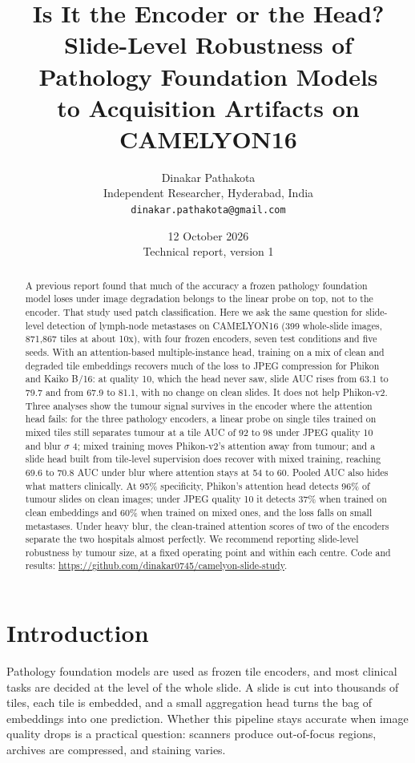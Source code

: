 \documentclass[11pt,a4paper]{article}
\title{\textbf{Is It the Encoder or the Head?\\ Slide-Level Robustness of Pathology Foundation Models\\ to Acquisition Artifacts on CAMELYON16}}
\author{Dinakar Pathakota\\[0.3em]
\small Independent Researcher, Hyderabad, India\\
\small \texttt{dinakar.pathakota@gmail.com}}
\date{12 October 2026\\[0.3em]\small Technical report, version 1}
\begin{document}
\maketitle

\begin{abstract}
\noindent A previous report found that much of the accuracy a frozen pathology foundation model loses under image degradation belongs to the linear probe on top, not to the encoder. That study used patch classification. Here we ask the same question for slide-level detection of lymph-node metastases on CAMELYON16 (399 whole-slide images, 871,867 tiles at about 10x), with four frozen encoders, seven test conditions and five seeds. With an attention-based multiple-instance head, training on a mix of clean and degraded tile embeddings recovers much of the loss to JPEG compression for Phikon and Kaiko B/16: at quality 10, which the head never saw, slide AUC rises from 63.1 to 79.7 and from 67.9 to 81.1, with no change on clean slides. It does not help Phikon-v2. Three analyses show the tumour signal survives in the encoder where the attention head fails: for the three pathology encoders, a linear probe on single tiles trained on mixed tiles still separates tumour at a tile AUC of 92 to 98 under JPEG quality 10 and blur $\sigma$ 4; mixed training moves Phikon-v2's attention away from tumour; and a slide head built from tile-level supervision does recover with mixed training, reaching 69.6 to 70.8 AUC under blur where attention stays at 54 to 60. Pooled AUC also hides what matters clinically. At 95\% specificity, Phikon's attention head detects 96\% of tumour slides on clean images; under JPEG quality 10 it detects 37\% when trained on clean embeddings and 60\% when trained on mixed ones, and the loss falls on small metastases. Under heavy blur, the clean-trained attention scores of two of the encoders separate the two hospitals almost perfectly. We recommend reporting slide-level robustness by tumour size, at a fixed operating point and within each centre. Code and results: \url{https://github.com/dinakar0745/camelyon-slide-study}.
\end{abstract}

\section{Introduction}

Pathology foundation models are used as frozen tile encoders, and most clinical tasks are decided at the level of the whole slide. A slide is cut into thousands of tiles, each tile is embedded, and a small aggregation head turns the bag of embeddings into one prediction. Whether this pipeline stays accurate when image quality drops is a practical question: scanners produce out-of-focus regions, archives are compressed, and staining varies.
\end{document}
